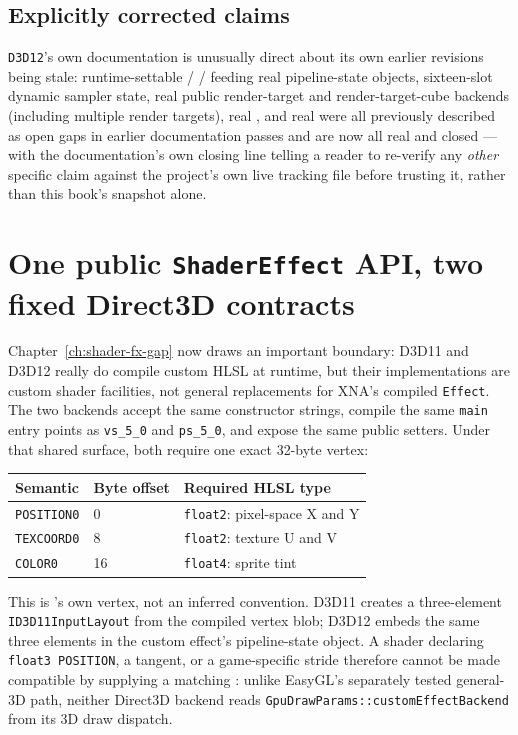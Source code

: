 \subsection{Explicitly corrected claims}

\texttt{D3D12}'s own documentation is unusually direct about its own earlier revisions being
stale: runtime-settable  / /%
 feeding real pipeline-state objects, sixteen-slot dynamic sampler
state, real public render-target and render-target-cube backends (including multiple render
targets), real , and real  were all
previously described as open gaps in earlier documentation passes and are now all real and
closed --- with the documentation's own closing line telling a reader to re-verify any
\emph{other} specific claim against the project's own live tracking file before trusting it,
rather than this book's snapshot alone.

\section{One public \texttt{ShaderEffect} API, two fixed Direct3D contracts}

Chapter~\ref{ch:shader-fx-gap} now draws an important boundary: D3D11 and D3D12 really do
compile custom HLSL at runtime, but their implementations are  custom
shader facilities, not general replacements for XNA's compiled \texttt{Effect}. The two
backends accept the same constructor strings, compile the same \texttt{main} entry points as
\texttt{vs\_5\_0} and \texttt{ps\_5\_0}, and expose the same public setters. Under that shared
surface, both require one exact 32-byte vertex:

\begin{longtable}{@{}p{}p{}p{}@{}}
\toprule
\textbf{Semantic} & \textbf{Byte offset} & \textbf{Required HLSL type} \\
\midrule
\endhead
\texttt{POSITION0} & 0  & \texttt{float2}: pixel-space X and Y \\
\texttt{TEXCOORD0} & 8  & \texttt{float2}: texture U and V \\
\texttt{COLOR0}    & 16 & \texttt{float4}: sprite tint \\
\bottomrule
\end{longtable}

This is 's own vertex, not an inferred convention. D3D11 creates a
three-element \texttt{ID3D11InputLayout} from the compiled vertex blob; D3D12 embeds the same
three elements in the custom effect's pipeline-state object. A shader declaring
\texttt{float3 POSITION}, a tangent, or a game-specific stride therefore cannot be made
compatible by supplying a matching : unlike EasyGL's separately
tested general-3D path, neither Direct3D backend reads
\texttt{GpuDrawParams::customEffectBackend} from its 3D draw dispatch.

